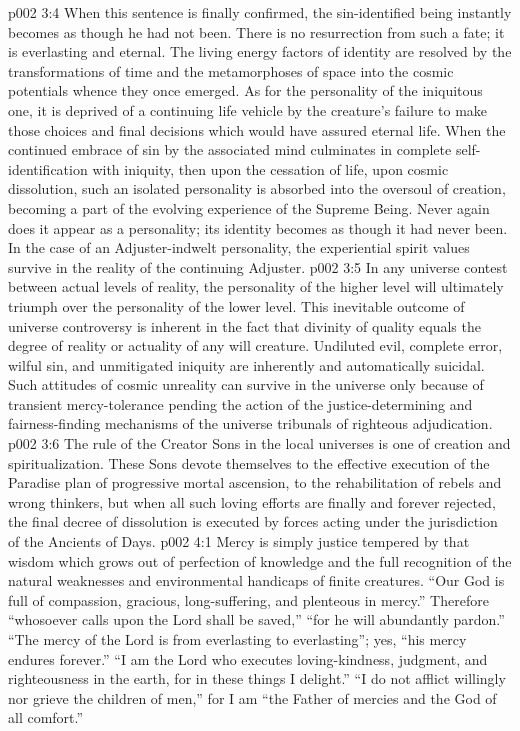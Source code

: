 \vs p002 3:4 When this sentence is finally confirmed, the sin\hyp{}identified being instantly becomes as though he had not been. There is no resurrection from such a fate; it is everlasting and eternal. The living energy factors of identity are resolved by the transformations of time and the metamorphoses of space into the cosmic potentials whence they once emerged. As for the personality of the iniquitous one, it is deprived of a continuing life vehicle by the creature’s failure to make those choices and final decisions which would have assured eternal life. When the continued embrace of sin by the associated mind culminates in complete self\hyp{}identification with iniquity, then upon the cessation of life, upon cosmic dissolution, such an isolated personality is absorbed into the oversoul of creation, becoming a part of the evolving experience of the Supreme Being. Never again does it appear as a personality; its identity becomes as though it had never been. In the case of an Adjuster\hyp{}indwelt personality, the experiential spirit values survive in the reality of the continuing Adjuster.
\vs p002 3:5 \pc In any universe contest between actual levels of reality, the personality of the higher level will ultimately triumph over the personality of the lower level. This inevitable outcome of universe controversy is inherent in the fact that divinity of quality equals the degree of reality or actuality of any will creature. Undiluted evil, complete error, wilful sin, and unmitigated iniquity are inherently and automatically suicidal. Such attitudes of cosmic unreality can survive in the universe only because of transient mercy\hyp{}tolerance pending the action of the justice\hyp{}determining and fairness\hyp{}finding mechanisms of the universe tribunals of righteous adjudication.
\vs p002 3:6 The rule of the Creator Sons in the local universes is one of creation and spiritualization. These Sons devote themselves to the effective execution of the Paradise plan of progressive mortal ascension, to the rehabilitation of rebels and wrong thinkers, but when all such loving efforts are finally and forever rejected, the final decree of dissolution is executed by forces acting under the jurisdiction of the Ancients of Days.
\vs p002 4:1 Mercy is simply justice tempered by that wisdom which grows out of perfection of knowledge and the full recognition of the natural weaknesses and environmental handicaps of finite creatures. “Our God is full of compassion, gracious, long\hyp{}suffering, and plenteous in mercy.” Therefore “whosoever calls upon the Lord shall be saved,” “for he will abundantly pardon.” “The mercy of the Lord is from everlasting to everlasting”; yes, “his mercy endures forever.” “I am the Lord who executes loving\hyp{}kindness, judgment, and righteousness in the earth, for in these things I delight.” “I do not afflict willingly nor grieve the children of men,” for I am “the Father of mercies and the God of all comfort.”
